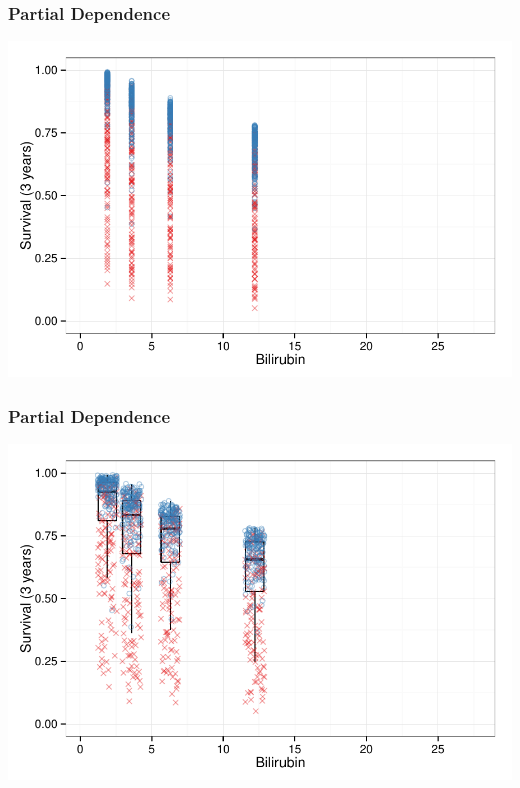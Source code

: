 \documentclass[xcolor=svgnames]{beamer}\usepackage[]{graphicx}\usepackage[]{color}
\newenvironment{knitrout}{}{} %
\begin{document}
\begin{frame}
\frametitle{Partial Dependence}

\begin{knitrout}\footnotesize
{}\color{fgcolor}

{\centering \includegraphics[width=.9\linewidth]{figures/nomogram-vdep-1} 

}



\end{knitrout}
\end{frame}
\begin{frame}
\frametitle{Partial Dependence}

\begin{knitrout}\footnotesize
{}\color{fgcolor}

{\centering \includegraphics[width=.9\linewidth]{figures/nomogram-vdep-mean-1} 

}



\end{knitrout}
\end{frame}
\end{document}
